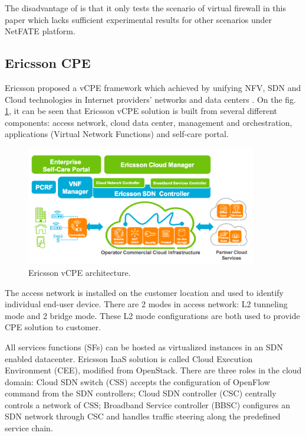The disadvantage of \cite{netfate} is that it only tests the scenario of virtual firewall in this paper which lacks sufficient experimental results for other scenarios under NetFATE platform.




\subsection{Ericsson CPE}
Ericsson proposed a vCPE framework which achieved by unifying NFV, SDN and Cloud technologies in Internet providers’ networks and data centers \cite{ericsson-vcpe}.
On the fig. \ref{fig:ericsson_archi}, it can be seen that Ericsson vCPE solution is built from several different components: access network, cloud data center, management and orchestration, applications (Virtual Network Functions) and self-care portal.

\begin{figure}[!t]
\centering
\includegraphics[width=0.9\textwidth]{./fig/ericsson_archi.png}
\caption{Ericsson vCPE architecture. \cite{ericsson-vcpe}}
\label{fig:ericsson_archi}
\end{figure}

The access network is installed on the customer location and used to identify individual end-user device.
There are 2 modes in access network: L2 tunneling mode and 2 bridge mode.
These L2 mode configurations are both used to provide CPE solution to customer.

All services functions (SFs) can be hosted as virtualized instances in an SDN enabled datacenter.
Ericsson IaaS solution is called Cloud Execution Environment (CEE), modified from OpenStack.
There are three roles in the cloud domain:
Cloud SDN switch (CSS) accepts the configuration of OpenFlow command from the SDN controllers;
Cloud SDN controller (CSC) centrally controls a network of CSS;
Broadband Service controller (BBSC) configures an SDN network through CSC and handles traffic steering along the predefined service chain.

